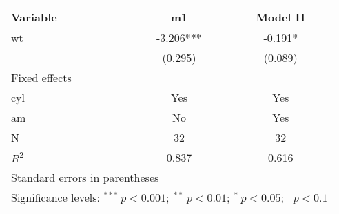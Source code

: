 \documentclass[11pt,a4paper,twoside]{article}
\begin{document}
\begin{tabular}{lcc}
\toprule
Variable & m1 & Model II
\\
\midrule
wt & -3.206*** & -0.191*
\\
 & (0.295) & (0.089)
\\
\midrule Fixed effects  &  &  \\
cyl & Yes & Yes \\
am & No & Yes \\
\midrule N & 32 & 32 \\
$R^2$ & 0.837 & 0.616 \\
\bottomrule
\multicolumn{3}{l}{\footnotesize Standard errors in parentheses} \\ 
\multicolumn{3}{l}{\footnotesize Significance levels: $^{***}\: p < 0.001;\: ^{**}\: p < 0.01;\: ^{*}\: p < 0.05;\: ^{.}\: p < 0.1$}
\end{tabular}
\end{document}
